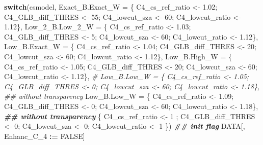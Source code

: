 \documentclass[
  10pt,
  a4paper,oneside]{article}
\newenvironment{Shaded}{\begin{snugshade}}{\end{snugshade}}
\newcommand{\AttributeTok}[1]{\textcolor[rgb]{0.13,0.29,0.53}{#1}}
\newcommand{\CommentTok}[1]{\textcolor[rgb]{0.56,0.35,0.01}{\textit{#1}}}
\newcommand{\ConstantTok}[1]{\textcolor[rgb]{0.56,0.35,0.01}{#1}}
\newcommand{\ControlFlowTok}[1]{\textcolor[rgb]{0.13,0.29,0.53}{\textbf{#1}}}
\newcommand{\DecValTok}[1]{\textcolor[rgb]{0.00,0.00,0.81}{#1}}
\newcommand{\DocumentationTok}[1]{\textcolor[rgb]{0.56,0.35,0.01}{\textbf{\textit{#1}}}}
\newcommand{\FloatTok}[1]{\textcolor[rgb]{0.00,0.00,0.81}{#1}}
\newcommand{\NormalTok}[1]{#1}
\newcommand{\OtherTok}[1]{\textcolor[rgb]{0.56,0.35,0.01}{#1}}
\newcommand{\SpecialCharTok}[1]{\textcolor[rgb]{0.81,0.36,0.00}{\textbf{#1}}}
\begin{document}
\begin{Shaded}
\begin{Highlighting}[]
\ControlFlowTok{switch}\NormalTok{(csmodel,}
       \AttributeTok{Exact\_B.Exact\_W =}\NormalTok{ \{ C4\_cs\_ref\_ratio }\OtherTok{\textless{}{-}} \FloatTok{1.02}\NormalTok{; C4\_GLB\_diff\_THRES }\OtherTok{\textless{}{-}} \DecValTok{55}\NormalTok{; C4\_lowcut\_sza }\OtherTok{\textless{}{-}} \DecValTok{60}\NormalTok{; C4\_lowcut\_ratio }\OtherTok{\textless{}{-}} \FloatTok{1.12}\NormalTok{\},}
       \AttributeTok{Low\_2\_B.Low\_2\_W =}\NormalTok{ \{ C4\_cs\_ref\_ratio }\OtherTok{\textless{}{-}} \FloatTok{1.03}\NormalTok{; C4\_GLB\_diff\_THRES }\OtherTok{\textless{}{-}}  \DecValTok{5}\NormalTok{; C4\_lowcut\_sza }\OtherTok{\textless{}{-}} \DecValTok{60}\NormalTok{; C4\_lowcut\_ratio }\OtherTok{\textless{}{-}} \FloatTok{1.12}\NormalTok{\},}
       \AttributeTok{Low\_B.Exact\_W   =}\NormalTok{ \{ C4\_cs\_ref\_ratio }\OtherTok{\textless{}{-}} \FloatTok{1.04}\NormalTok{; C4\_GLB\_diff\_THRES }\OtherTok{\textless{}{-}} \DecValTok{20}\NormalTok{; C4\_lowcut\_sza }\OtherTok{\textless{}{-}} \DecValTok{60}\NormalTok{; C4\_lowcut\_ratio }\OtherTok{\textless{}{-}} \FloatTok{1.12}\NormalTok{\},}
       \AttributeTok{Low\_B.High\_W    =}\NormalTok{ \{ C4\_cs\_ref\_ratio }\OtherTok{\textless{}{-}} \FloatTok{1.05}\NormalTok{; C4\_GLB\_diff\_THRES }\OtherTok{\textless{}{-}} \DecValTok{20}\NormalTok{; C4\_lowcut\_sza }\OtherTok{\textless{}{-}} \DecValTok{60}\NormalTok{; C4\_lowcut\_ratio }\OtherTok{\textless{}{-}} \FloatTok{1.12}\NormalTok{\},}
       \CommentTok{\# Low\_B.Low\_W     = \{ C4\_cs\_ref\_ratio \textless{}{-} 1.05; C4\_GLB\_diff\_THRES \textless{}{-}  0; C4\_lowcut\_sza \textless{}{-} 60; C4\_lowcut\_ratio \textless{}{-} 1.18\}, \#\# without transparency}
       \AttributeTok{Low\_B.Low\_W     =}\NormalTok{ \{ C4\_cs\_ref\_ratio }\OtherTok{\textless{}{-}} \FloatTok{1.09}\NormalTok{; C4\_GLB\_diff\_THRES }\OtherTok{\textless{}{-}}  \DecValTok{0}\NormalTok{; C4\_lowcut\_sza }\OtherTok{\textless{}{-}} \DecValTok{60}\NormalTok{; C4\_lowcut\_ratio }\OtherTok{\textless{}{-}} \FloatTok{1.18}\NormalTok{\}, }\DocumentationTok{\#\# without transparency}
\NormalTok{                         \{ C4\_cs\_ref\_ratio }\OtherTok{\textless{}{-}} \DecValTok{1}\NormalTok{   ; C4\_GLB\_diff\_THRES }\OtherTok{\textless{}{-}}  \DecValTok{0}\NormalTok{; C4\_lowcut\_sza }\OtherTok{\textless{}{-}}  \DecValTok{0}\NormalTok{; C4\_lowcut\_ratio }\OtherTok{\textless{}{-}} \DecValTok{1}\NormalTok{   \})}
\DocumentationTok{\#\# init flag}
\NormalTok{DATA[, Enhanc\_C\_4 }\SpecialCharTok{:=} \ConstantTok{FALSE}\NormalTok{]}


\end{Highlighting}
\end{Shaded}
\end{document}
